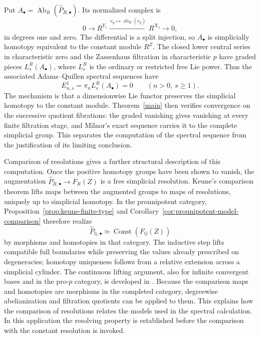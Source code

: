 \documentclass[11pt,a4paper]{article}
\begin{document}
Put $A_\bullet=\operatorname{Ab}_R(\widehat P_{R,\bullet})$.
Its normalized complex is
\[
 0\longrightarrow R^{Y_1}
 \xrightarrow{\,e_y\mapsto\operatorname{ab}_R(r_y)\,}
 R^{X_1}\longrightarrow0,
\]
in degrees one and zero.  The differential is a split injection, so
$A_\bullet$ is simplicially homotopy equivalent to the constant
module $R^Z$.  The closed lower central series in characteristic zero
and the Zassenhaus filtration in characteristic $p$ have graded
pieces $L_s^R(A_\bullet)$, where $L_s^R$ is the ordinary or restricted
free Lie power.  Thus the associated Adams--Quillen spectral sequences
have
\[
 E^1_{n,s}=\pi_nL_s^R(A_\bullet)=0
 \qquad(n>0,\ s\geq1).
\]
The mechanism is that a dimensionwise Lie functor preserves the
simplicial homotopy to the constant module.  Theorem~\ref{main}
then verifies convergence on the successive quotient fibrations:
the graded vanishing gives vanishing at every finite filtration
stage, and Milnor's exact sequence carries it to the complete
simplicial group.  This separates the computation of the spectral
sequence from the justification of its limiting conclusion.

Comparison of resolutions gives a further structural description of
this computation.  Once the positive homotopy groups have been shown
to vanish, the augmentation
$\widehat P_{R,\bullet}\to F_R(Z)$ is a free simplicial resolution.
Keune's comparison theorem lifts maps between the augmented groups
to maps of resolutions, uniquely up to simplicial homotopy.  In the
prounipotent category, Proposition~\ref{prop:keune-finite-type} and
Corollary~\ref{cor:prounipotent-model-comparison} therefore realize
\[
 \widehat P_{\mathbb Q,\bullet}\simeq
 \operatorname{Const}(F_{\mathbb Q}(Z))
\]
by morphisms and homotopies in that category.  The inductive step
lifts compatible full boundaries while preserving the values
already prescribed on degeneracies; homotopy uniqueness follows
from a relative extension across a simplicial cylinder.  The
continuous lifting argument, also for infinite convergent bases and
in the pro-$p$ category, is developed in
\cite[Proposition~2.3 and Theorem~4.2]{MikhContinuous}.
Because the comparison maps and homotopies are morphisms in the
completed category, degreewise abelianization and filtration
quotients can be applied to them.  This explains how the comparison
of resolutions relates the models used in the spectral calculation.
In this application the resolving property is established before
the comparison with the constant resolution is invoked.
\end{document}
